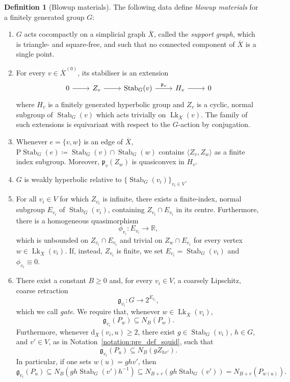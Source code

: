 \documentclass[svgnames]{amsart}
\theoremstyle{plain}
\theoremstyle{definition}
\newtheorem{defn}[thm]{Definition}
\newcommand{\ov}[1]{\overline{#1}}
\newcommand{\dist}{\mathrm{d}}
\newcommand{\link}{\operatorname{Lk}}
\newcommand{\Stab}[2]{\operatorname{Stab}_{#1}(#2)}
\newcommand{\gate}{\mathfrak{g}}
\newcommand{\p}{\mathfrak{p}}
\begin{document}
\begin{defn}[Blowup materials]\label{defn:squid_material}
The following data define \emph{blowup materials} for a finitely generated group $G$:
    \begin{enumerate}
        \item\label{squid_material:graph} $G$ acts cocompactly on a simplicial graph $\ov{X}$, called the \emph{support graph}, which is triangle- and square-free, and such that no connected component of $\ov{X}$ is a single point.
        \item\label{squid_material:extensions}
        For every $v\in \ov X^{(0)}$, its stabiliser is an extension
        $$\begin{tikzcd}
        0\ar{r}&Z_v\ar{r}&\Stab{G}{v}\ar{r}{\p_v}&H_v\ar{r}&0
        \end{tikzcd}$$
        where $H_v$ is a finitely generated hyperbolic group and $Z_v$ is a cyclic, normal subgroup of $\Stab{G}{v}$ which acts trivially on $\link_{\ov X}(v)$. The family of such extensions is equivariant with respect to the $G$-action by conjugation.
        \item\label{squid_material:edge_stab} Whenever $e=\{v,w\}$ is an edge of $\ov{X}$, $\text{P}\Stab{G}{e}\coloneq\Stab{G}{v}\cap\Stab{G}{w}$ contains $\langle Z_v, Z_w\rangle $ as a finite index subgroup. Moreover, $\p_v(Z_w)$ is quasiconvex in $H_v$.
        \item\label{squid_material:big_papa} $G$ is weakly hyperbolic relative to $\{\Stab{G}{v_i}\}_{v_i\in V}$.
        \item\label{squid_material:quasimorphisms}
        For all $v_i\in V$ for which $Z_{v_i}$ is infinite, there exists a finite-index, normal subgroup $E_{v_i}$ of $\Stab{G}{v_i}$, containing $Z_{v_i}\cap E_{v_i}$ in its centre. Furthermore, there is a homogeneous quasimorphism
        $$\phi_{v_i}\colon E_{v_i}\to \mathbb{R},$$
        which is unbounded on $Z_{v_i}\cap E_{v_i}$ and trivial on $Z_w\cap E_{v_i}$ for every vertex $w\in\link_{\ov X}(v_i)$. If, instead, $Z_{v_i}$ is finite, we set $E_{v_i}=\Stab{G}{v_i}$ and $\phi_{v_i}\equiv 0$.
        \item\label{squid_material:gates}
        There exist a constant $B\ge 0$ and, for every $v_i\in V$, a coarsely Lipschitz, coarse retraction $$\gate_{v_i}\colon G\to 2^{E_{v_i}},$$
        which we call \emph{gate}. We require that, whenever $w\in\link_{\ov X}(v_i)$, $$\gate_{v_i}(P_w)\subseteq N_B(P_w).$$ Furthermore, whenever $\dist_{\ov X}(v_i, u)\ge 2$, there exist $g\in\Stab{G}{v_i}$, $h\in G$, and $v'\in V$, as in Notation~\ref{notation:pre_def_squid}, such that 
        $$\gate_{v_i}(P_u)\subseteq N_B(gZ_{hv'}).$$
        In particular, if one sets $w(u)=ghv'$, then
        $$\gate_{v_i}(P_u)\subseteq N_B(gh\Stab{G}{v'}h^{-1})\subseteq N_{B+r}(gh\Stab{G}{v'})=N_{B+r}(P_{w(u)}).$$
    \end{enumerate}
\end{defn}
\end{document}
